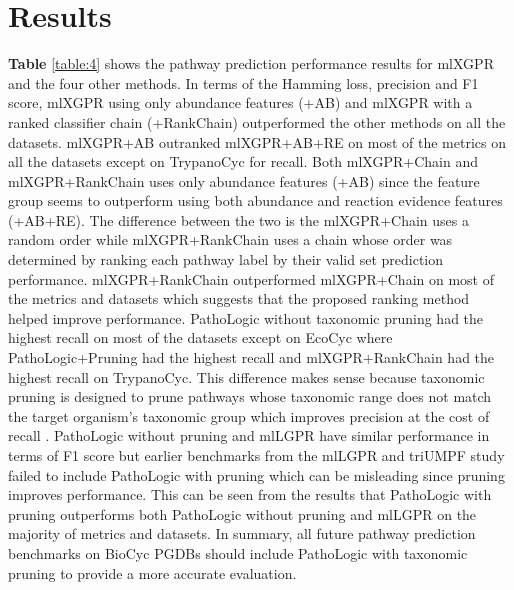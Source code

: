 \documentclass[sn-mathphys,Numbered]{sn-jnl}%
\theoremstyle{thmstyleone}%
\theoremstyle{thmstyletwo}%
\theoremstyle{thmstylethree}%
\begin{document}
\section{Results}\label{sec3}

\textbf{Table} \ref{table:4} shows the pathway prediction performance results for mlXGPR and the four other methods.
In terms of the Hamming loss, precision and F1 score, mlXGPR using only abundance features (+AB) and mlXGPR with a ranked classifier chain (+RankChain) outperformed the other methods on all the datasets.
mlXGPR+AB outranked mlXGPR+AB+RE on most of the metrics on all the datasets except on TrypanoCyc for recall.
Both mlXGPR+Chain and mlXGPR+RankChain uses only abundance features (+AB) since the feature group seems to outperform using both abundance and reaction evidence features (+AB+RE).
The difference between the two is the mlXGPR+Chain uses a random order while mlXGPR+RankChain uses a chain whose order was determined by ranking each pathway label by their valid set prediction performance.
mlXGPR+RankChain outperformed mlXGPR+Chain on most of the metrics and datasets which suggests that the proposed ranking method helped improve performance.
PathoLogic without taxonomic pruning had the highest recall on most of the datasets except on EcoCyc where PathoLogic+Pruning had the highest recall and mlXGPR+RankChain had the highest recall on TrypanoCyc.
This difference makes sense because taxonomic pruning is designed to prune pathways whose taxonomic range does not match the target organism's taxonomic group which improves precision at the cost of recall \cite{karpPathwayToolsPathway2011}.
PathoLogic without pruning and mlLGPR have similar performance in terms of F1 score but earlier benchmarks from the mlLGPR and triUMPF study failed to include PathoLogic with pruning which can be misleading since pruning improves performance.
This can be seen from the results that PathoLogic with pruning outperforms both PathoLogic without pruning and mlLGPR on the majority of metrics and datasets.
In summary, all future pathway prediction benchmarks on BioCyc PGDBs should include PathoLogic with taxonomic pruning to provide a more accurate evaluation.
\end{document}
